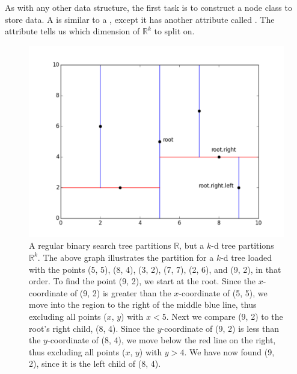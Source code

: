As with any other data structure, the first task is to construct a node class to store data.
A  is similar to a , except it has another attribute called .
The  attribute tells us which dimension of $\mathbb{R}^k$ to split on.


\begin{figure}[H]
\includegraphics[width=\textwidth]{figures/kdpic1.pdf}
\caption{A regular binary search tree partitions $\mathbb{R}$, but a $k$-d tree partitions $\mathbb{R}^{k}$. The above graph illustrates the partition for a $k$-d tree loaded with the points (5, 5), (8, 4), (3, 2), (7, 7), (2, 6), and (9, 2), in that order. To find the point (9, 2), we start at the root. Since the $x$-coordinate of (9, 2) is greater than the $x$-coordinate of (5, 5), we move into the region to the right of the middle blue line, thus excluding all points ($x$, $y$) with $x < 5$. Next we compare (9, 2) to the root's right child, (8, 4). Since the $y$-coordinate of (9, 2) is less than the $y$-coordinate of (8, 4), we move below the red line on the right, thus excluding all points ($x$, $y$) with $y > 4$. We have now found (9, 2), since it is the left child of (8, 4).}
\label{fig:k-binary-search}
\end{figure}

